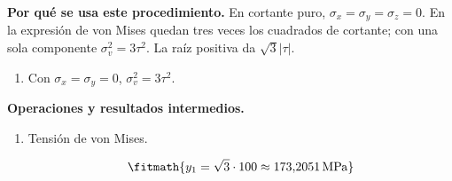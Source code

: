\noindent\textbf{Por qué se usa este procedimiento.} En cortante puro, $\sigma_x=\sigma_y=\sigma_z=0$. En la expresión de von Mises quedan tres veces los cuadrados de cortante; con una sola componente $\sigma_v^2=3\tau^2$. La raíz positiva da $\sqrt3|\tau|$.

\begin{enumerate}

\item Con $\sigma_x = \sigma_y = 0$, $\sigma_v^2 = 3\tau^2$.

\end{enumerate}

\noindent\textbf{Operaciones y resultados intermedios.}

\begin{enumerate}

\item Tensión de von Mises.

\[\fitmath{y_{1}=\sqrt{3}\cdot 100\approx 173{,}2051\,\mathrm{MPa}}\]

\end{enumerate}
